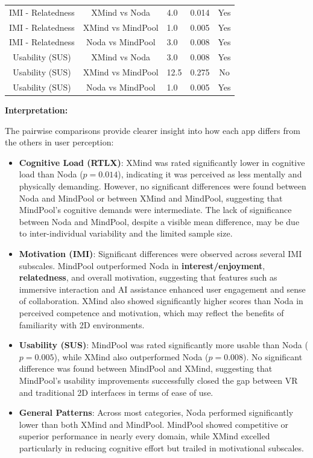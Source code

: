 \documentclass{CPP}
\begin{document}
\begin{table}[h!]
\begin{tabular}{|c|c|p{2cm}|c|c|}
        IMI - Relatedness & XMind vs Noda & 4.0 & 0.014 & Yes \\
        IMI - Relatedness & XMind vs MindPool & 1.0 & 0.005 & Yes \\
        IMI - Relatedness & Noda vs MindPool & 3.0 & 0.008 & Yes \\
        Usability (SUS) & XMind vs Noda & 3.0 & 0.008 & Yes \\
        Usability (SUS) & XMind vs MindPool & 12.5 & 0.275 & No \\
        Usability (SUS) & Noda vs MindPool & 1.0 & 0.005 & Yes \\
        \hline
    \end{tabular}
\end{table}



\textbf{Interpretation:}

The pairwise comparisons provide clearer insight into how each app differs from the others in user perception:

\begin{itemize}
    \item \textbf{Cognitive Load (RTLX)}: XMind was rated significantly lower in cognitive load than Noda ($p = 0.014$), indicating it was perceived as less mentally and physically demanding. However, no significant differences were found between Noda and MindPool or between XMind and MindPool, suggesting that MindPool's cognitive demands were intermediate. The lack of significance between Noda and MindPool, despite a visible mean difference, may be due to inter-individual variability and the limited sample size.

    \item \textbf{Motivation (IMI)}: Significant differences were observed across several IMI subscales. MindPool outperformed Noda in \textbf{interest/enjoyment}, \textbf{relatedness}, and overall motivation, suggesting that features such as immersive interaction and AI assistance enhanced user engagement and sense of collaboration. XMind also showed significantly higher scores than Noda in perceived competence and motivation, which may reflect the benefits of familiarity with 2D environments.

    \item \textbf{Usability (SUS)}: MindPool was rated significantly more usable than Noda ($p = 0.005$), while XMind also outperformed Noda ($p = 0.008$). No significant difference was found between MindPool and XMind, suggesting that MindPool’s usability improvements successfully closed the gap between VR and traditional 2D interfaces in terms of ease of use.

    \item \textbf{General Patterns}: Across most categories, Noda performed significantly lower than both XMind and MindPool. MindPool showed competitive or superior performance in nearly every domain, while XMind excelled particularly in reducing cognitive effort but trailed in motivational subscales.
\end{itemize}
\end{document}

